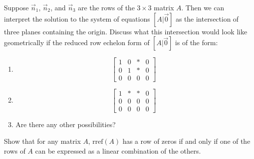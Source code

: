 \documentclass{ximera}
\begin{document}
\begin{problem}\label{prob:Anna3.2}
        Suppose $\vec{n}_1$, $\vec{n}_2$, and $\vec{n}_3$ are the rows of the $3 \times 3$ matrix $A$.  Then we can interpret the solution to the system of equations $[A|\vec{0}]$ as the intersection of three planes containing the origin.  Discuss what this intersection would look like geometrically if the reduced row echelon form of $[A|\vec{0}]$ is of the form:

\begin{enumerate}
\item
\begin{equation*}
\left[
\begin{array}{ccc|c}
1 & 0 & * & 0 \\
0 & 1 & * & 0 \\
0 & 0 & 0 & 0
\end{array}
\right]
\end{equation*}

\item
\begin{equation*}
\left[
\begin{array}{ccc|c}
1 & * & * & 0 \\
0 & 0 & 0 & 0 \\
0 & 0 & 0 & 0
\end{array}
\right]
\end{equation*}

\item  Are there any other possibilities?
            
\end{enumerate}
\end{problem}

\begin{problem}\label{prob:rowOfZeros}
    Show that for any matrix $A$, $\text{rref}(A)$ has a row of zeros if and only if one of the rows of $A$ can be expressed as a linear combination of the others.
\end{problem}
\end{document}
